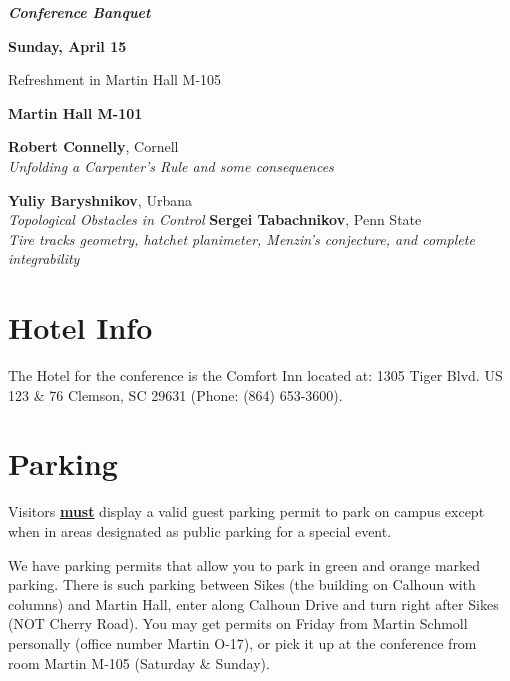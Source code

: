 \documentclass[a4paper,10pt,foldmark,notumble]{leaflet}
\begin{document}
\vspace{0.5cm}

\hspace{-0.5cm}{\scriptsize 6:00 pm - 7:30 pm}
\textit{\textbf{Conference Banquet}}


\vspace{0.2cm}
{\large \bf Sunday, April 15}


\hspace{-0.5cm}{\scriptsize 8:30 am - 9:00 am} Refreshment in Martin Hall M-105


{\bf Martin Hall M-101}

\hspace{-0.5cm}{\scriptsize 9:00 am - 10:00 am} {\bf Robert Connelly},
Cornell \\ {\it Unfolding a Carpenter's Rule and some
consequences}

\hspace{-0.5cm}{\scriptsize 10:15 am - 11:15 am} {\bf Yuliy
Baryshnikov}, Urbana\\ {\it Topological Obstacles in Control}
\hspace{-0.5cm}{\scriptsize 11:30 am - 12:30 pm} {\bf Sergei
Tabachnikov}, Penn State \\
{\it Tire tracks geometry, hatchet
planimeter, Menzin's conjecture, and complete integrability}


\section{Hotel Info}
The Hotel for the conference is the Comfort Inn located at:
1305 Tiger Blvd.
US 123 \& 76
Clemson, SC 29631
(Phone: (864) 653-3600).

\section{Parking}
Visitors \underline{\bf must} display a valid guest parking permit to
park on campus except when in areas designated as public parking for a
special event.


We have parking permits that allow you to park in green and orange
marked parking. There is such parking between Sikes (the building on
Calhoun with columns) and Martin Hall, enter along Calhoun Drive and
turn right after Sikes (NOT Cherry Road). You may get permits on Friday
from Martin Schmoll personally (office number Martin O-17), or pick it
up at the conference from room Martin M-105 (Saturday \& Sunday).
\end{document}
